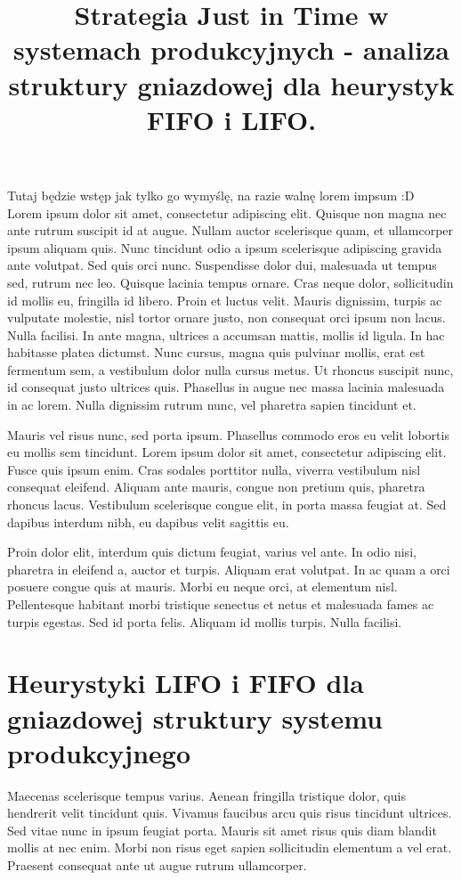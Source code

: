 \documentclass[twoside]{pracaInzynierskaMS}
\title{Strategia Just in Time w systemach produkcyjnych - analiza struktury gniazdowej dla heurystyk\\ FIFO i LIFO.}
\begin{document}
Tutaj będzie wstęp jak tylko go wymyślę, na razie walnę lorem impsum :D \\

Lorem ipsum dolor sit amet, consectetur adipiscing elit. Quisque non magna nec ante rutrum suscipit id at augue. Nullam auctor scelerisque quam, et ullamcorper ipsum aliquam quis. Nunc tincidunt odio a ipsum scelerisque adipiscing gravida ante volutpat. Sed quis orci nunc. Suspendisse dolor dui, malesuada ut tempus sed, rutrum nec leo. Quisque lacinia tempus ornare. Cras neque dolor, sollicitudin id mollis eu, fringilla id libero. Proin et luctus velit. Mauris dignissim, turpis ac vulputate molestie, nisl tortor ornare justo, non consequat orci ipsum non lacus. Nulla facilisi. In ante magna, ultrices a accumsan mattis, mollis id ligula. In hac habitasse platea dictumst. Nunc cursus, magna quis pulvinar mollis, erat est fermentum sem, a vestibulum dolor nulla cursus metus. Ut rhoncus suscipit nunc, id consequat justo ultrices quis. Phasellus in augue nec massa lacinia malesuada in ac lorem. Nulla dignissim rutrum nunc, vel pharetra sapien tincidunt et. 

Mauris vel risus nunc, sed porta ipsum. Phasellus commodo eros eu velit lobortis eu mollis sem tincidunt. Lorem ipsum dolor sit amet, consectetur adipiscing elit. Fusce quis ipsum enim. Cras sodales porttitor nulla, viverra vestibulum nisl consequat eleifend. Aliquam ante mauris, congue non pretium quis, pharetra rhoncus lacus. Vestibulum scelerisque congue elit, in porta massa feugiat at. Sed dapibus interdum nibh, eu dapibus velit sagittis eu. 

Proin dolor elit, interdum quis dictum feugiat, varius vel ante. In odio nisi, pharetra in eleifend a, auctor et turpis. Aliquam erat volutpat. In ac quam a orci posuere congue quis at mauris. Morbi eu neque orci, at elementum nisl. Pellentesque habitant morbi tristique senectus et netus et malesuada fames ac turpis egestas. Sed id porta felis. Aliquam id mollis turpis. Nulla facilisi.

\section    [Heurystyki LIFO i FIFO \ldots]
            {Heurystyki LIFO i FIFO \newlineSpis dla gniazdowej \newlineTekst struktury systemu produkcyjnego}

Maecenas scelerisque tempus varius. Aenean fringilla tristique dolor, quis hendrerit velit tincidunt quis. Vivamus faucibus arcu quis risus tincidunt ultrices. Sed vitae nunc in ipsum feugiat porta. Mauris sit amet risus quis diam blandit mollis at nec enim. Morbi non risus eget sapien sollicitudin elementum a vel erat. Praesent consequat ante ut augue rutrum ullamcorper. 
\end{document}
